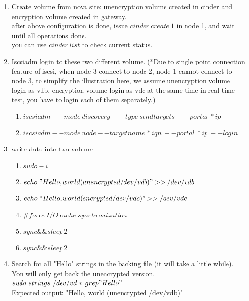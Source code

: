 \documentclass[10pt]{report}
\begin{document}
			\begin{enumerate}
			\item Create volume from nova site: unencryption volume created in cinder and encryption volume created in gateway.\\
			after above configuration is done, issue $cinder\ create\ 1$ in node 1, and wait until all operations done.\\
			you can use $cinder\ list$ to check current status.
			\item Iscsiadm login to these two different volume. (*Due to single point connection feature of iscsi, when node 3 connect to node 2, 
			node 1 cannot connect to node 3, to simplify the illustration here, we assume unencryption volume login as vdb, encryption volume login as vdc at the same time
			in real time test, you have to login each of them separately.)
			\begin{enumerate}[$\bullet$]
			
				\item $iscsiadm --mode\ discovery\ --type\ sendtargets\ --portal\ *ip$
				\item $iscsiadm --mode\ node --targetname\ *iqn\ --portal\ *ip\ --login$
 			\end{enumerate}
			
			
			\item write data into two volume 
			\begin{enumerate}[$\bullet$]
				\item $sudo -i$
 				\item $echo\ "Hello, world (unencrypted /dev/vdb)" >> /dev/vdb$
  				\item $echo\ "Hello, world (encrypted /dev/vdc)" >> /dev/vdc$
  				\item $\# force\ I/O\ cache\ synchronization$
  				\item $sync \& \& sleep\ 2$
 				\item $sync \& \& sleep\ 2$
			\end{enumerate}
			\item 
			Search for all "Hello" strings in the backing file (it will take a little while).  You will only get back the unencrypted version.\\
  			$sudo\ strings\ /dev/vd* | grep "Hello"$\\
  			Expected output: "Hello, world (unencrypted /dev/vdb)"
			\end{enumerate}		
			
\end{document}
